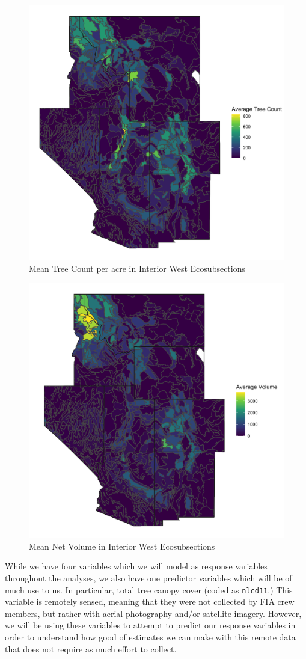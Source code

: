 \documentclass[12pt,twoside]{reedthesis}
\begin{document}
\begin{figure}

{\centering \includegraphics[width=0.65\linewidth]{figure/count} 

}

\caption{Mean Tree Count per acre in Interior West Ecosubsections}\label{fig:unnamed-chunk-8}
\end{figure}
\begin{figure}

{\centering \includegraphics[width=0.65\linewidth]{figure/voln} 

}

\caption{Mean Net Volume in Interior West Ecosubsections}\label{fig:unnamed-chunk-9}
\end{figure}
While we have four variables which we will model as response variables throughout the analyses, we also have one predictor variables which will be of much use to us. In particular, total tree canopy cover (coded as \texttt{nlcd11}.) This variable is remotely sensed, meaning that they were not collected by FIA crew members, but rather with aerial photography and/or satellite imagery. However, we will be using these variables to attempt to predict our response variables in order to understand how good of estimates we can make with this remote data that does not require as much effort to collect.
\end{document}
